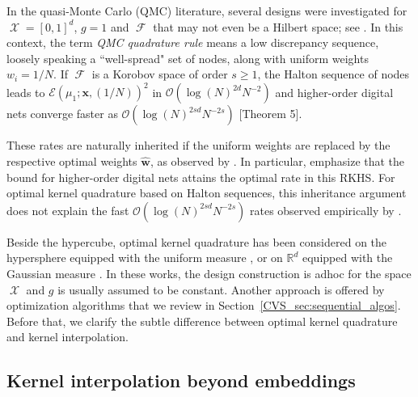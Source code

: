 \documentclass[twoside,11pt]{book}
\numberwithin{theorem}{chapter}
\numberwithin{definition}{chapter}
\numberwithin{proposition}{chapter}
\numberwithin{corollary}{chapter}
\numberwithin{example}{chapter}
\numberwithin{lemma}{chapter}
\DeclareMathOperator{\F}{\mathcal{F}}
\DeclareMathOperator{\X}{\mathcal{X}}
\begin{document}
In the quasi-Monte Carlo (QMC) literature, several designs were investigated for $\X = [0,1]^{d}$, $g = 1$ and $\F$ that may not even be a Hilbert space; see \citep{DiPi10}. In this context, the term \emph{QMC quadrature rule} means a low discrepancy sequence, loosely speaking a ``well-spread" set of nodes, along with uniform weights $w_{i} = 1/N$. If $\F$ is a Korobov space of order $s \geq 1$, the Halton sequence of nodes \citep{Hal64} leads to $\mathcal{E}(\mu_1; \bm{x}, (1/N))^2$ in $\mathcal{O}(\log(N)^{2d} N^{-2})$ and higher-order digital nets converge faster as $\mathcal{O}(\log(N)^{2sd} N^{-2s})$ \citep{DiPi14}[Theorem 5].

These rates are naturally inherited if the uniform weights are replaced by the respective optimal weights $\hat{\bm{w}}$, as observed by \cite{BOGOS2019}. In particular, \cite{BOGOS2019} emphasize that the bound for higher-order digital nets attains the optimal rate in this RKHS.
For optimal kernel quadrature based on Halton sequences, this inheritance argument does not explain the fast $\mathcal{O}(\log(N)^{2sd} N^{-2s})$ rates observed empirically by \cite{Oett17}.

Beside the hypercube, optimal kernel quadrature has been considered on the hypersphere equipped with the uniform measure \citep{EhGrCh19}, or on $\mathbb{R}^{d}$ equipped with the Gaussian measure \citep{KaSa19}. In these works, the design construction is adhoc for the space $\X$ and
$g$ is usually assumed to be constant. Another approach is offered by optimization algorithms that we review in Section~\ref{CVS_sec:sequential_algos}. Before that, we clarify the subtle difference between optimal kernel quadrature and kernel interpolation.

\subsection{Kernel interpolation beyond embeddings}\label{CVS_sec:review_kernel_interpolation_beyond_mu}
\end{document}
